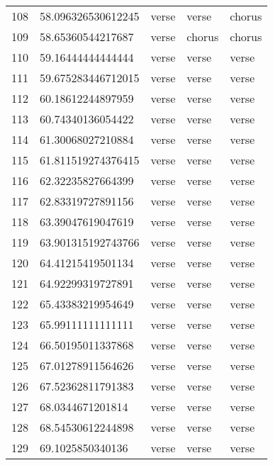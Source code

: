 \begin{table}[]
\begin{tabular}{lllll}
    108  & 58.096326530612245 & verse        & verse           & chorus         \\
    109  & 58.65360544217687  & verse        & chorus          & chorus         \\
    110  & 59.16444444444444  & verse        & verse           & verse          \\
    111  & 59.675283446712015 & verse        & verse           & verse          \\
    112  & 60.18612244897959  & verse        & verse           & verse          \\
    113  & 60.74340136054422  & verse        & verse           & verse          \\
    114  & 61.30068027210884  & verse        & verse           & verse          \\
    115  & 61.811519274376415 & verse        & verse           & verse          \\
    116  & 62.32235827664399  & verse        & verse           & verse          \\
    117  & 62.83319727891156  & verse        & verse           & verse          \\
    118  & 63.39047619047619  & verse        & verse           & verse          \\
    119  & 63.901315192743766 & verse        & verse           & verse          \\
    120  & 64.41215419501134  & verse        & verse           & verse          \\
    121  & 64.92299319727891  & verse        & verse           & verse          \\
    122  & 65.43383219954649  & verse        & verse           & verse          \\
    123  & 65.99111111111111  & verse        & verse           & verse          \\
    124  & 66.50195011337868  & verse        & verse           & verse          \\
    125  & 67.01278911564626  & verse        & verse           & verse          \\
    126  & 67.52362811791383  & verse        & verse           & verse          \\
    127  & 68.0344671201814   & verse        & verse           & verse          \\
    128  & 68.54530612244898  & verse        & verse           & verse          \\
    129  & 69.1025850340136   & verse        & verse           & verse          \\

\end{tabular}
\end{table}
